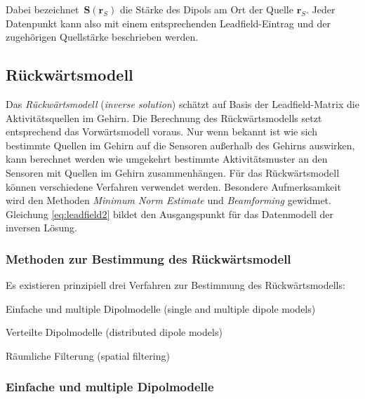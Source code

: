 \documentclass[doc,a4paper,12pt]{apa6}
\newcommand{\mx}[1]{\mathbf{#1}}
\begin{document}
Dabei bezeichnet~$\mx{S}(\mx{r}_S)$ die Stärke des Dipols am Ort der Quelle $\mx{r}_S$. Jeder Datenpunkt kann also mit einem entsprechenden Leadfield-Eintrag und der zugehörigen Quellstärke beschrieben werden.



\subsection{Rückwärtsmodell}

Das \emph{Rückwärtsmodell} (\emph{inverse solution}) schätzt auf Basis der Leadfield-Matrix die Aktivitätsquellen im Gehirn. Die Berechnung des Rückwärtsmodells setzt entsprechend das Vorwärtsmodell voraus. Nur wenn bekannt ist wie sich bestimmte Quellen im Gehirn auf die Sensoren außerhalb des Gehirns auswirken, kann berechnet werden wie umgekehrt bestimmte Aktivitätsmuster an den Sensoren mit Quellen im Gehirn zusammenhängen. Für das Rückwärtsmodell können verschiedene Verfahren verwendet werden. Besondere Aufmerksamkeit wird den Methoden \emph{Minimum Norm Estimate} und \emph{Beamforming} gewidmet. Gleichung \ref{eq:leadfield2} bildet den Ausgangspunkt für das Datenmodell der inversen Lösung.

\subsubsection{Methoden zur Bestimmung des Rückwärtsmodell}

Es existieren prinzipiell drei Verfahren zur Bestimmung des Rückwärtsmodells:

\begin{compactitem}
\item Einfache und multiple Dipolmodelle (single and multiple dipole models)
\item Verteilte Dipolmodelle (distributed dipole models)
\item Räumliche Filterung (spatial filtering)
\end{compactitem}

\subsubsection{Einfache und multiple Dipolmodelle}
\end{document}
